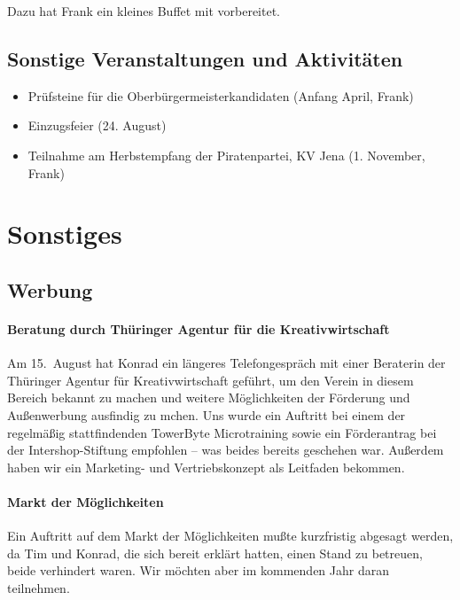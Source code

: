 \documentclass[10pt,DIV16]{scrartcl}
\begin{document}
Dazu hat Frank ein kleines Buffet mit vorbereitet.

\subsection{Sonstige Veranstaltungen und Aktivitäten}

\begin{itemize}
	\item Prüfsteine für die Oberbürgermeisterkandidaten (Anfang April, Frank)
	\item Einzugsfeier (24. August)
	\item Teilnahme am Herbstempfang der Piratenpartei, KV Jena (1. November, Frank)
\end{itemize}


\section{Sonstiges}

\subsection{Werbung}

\paragraph{Beratung durch Thüringer Agentur für die Kreativwirtschaft}

Am 15.~August hat Konrad ein längeres Telefongespräch mit einer
Beraterin der Thüringer Agentur für Kreativwirtschaft geführt, um
den Verein in diesem Bereich bekannt zu machen und weitere
Möglichkeiten der Förderung und Außenwerbung ausfindig zu mchen. 
Uns wurde ein Auftritt bei einem der regelmäßig stattfindenden
TowerByte Microtraining sowie ein Förderantrag bei der
Intershop-Stiftung empfohlen -- was beides bereits geschehen war. 
Außerdem haben wir ein Marketing- und Vertriebskonzept als Leitfaden
bekommen.

\paragraph{Markt der Möglichkeiten}

Ein Auftritt auf dem Markt der Möglichkeiten mußte kurzfristig abgesagt
werden, da Tim und Konrad, die sich bereit erklärt hatten, einen Stand zu
betreuen, beide verhindert waren.  Wir möchten aber im kommenden Jahr daran
teilnehmen.
\end{document}
